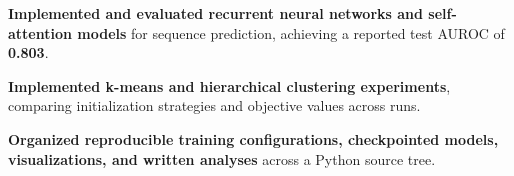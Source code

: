 \begin{bullets}
    \item \textbf{Implemented and evaluated recurrent neural networks and self-attention models} for sequence prediction, achieving a reported test AUROC of \textbf{0.803}.
    \item \textbf{Implemented k-means and hierarchical clustering experiments}, comparing initialization strategies and objective values across runs.
    \item \textbf{Organized reproducible training configurations, checkpointed models, visualizations, and written analyses} across a Python source tree.
\end{bullets}